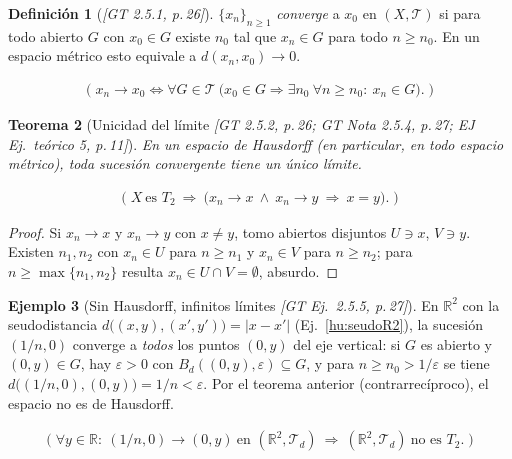 \documentclass[11pt,a4paper]{article}
\newcommand{\lgc}[1]{\par\vspace{-3pt}\begin{gather*}\big(\;#1\;\big)\end{gather*}\vspace{-6pt}}
\theoremstyle{definition}
\newtheorem{definicion}{Definición}[section]
\newtheorem{ejemplo}[definicion]{Ejemplo}
\theoremstyle{plain}
\newtheorem{teorema}[definicion]{Teorema}
\newcommand{\fnt}[1]{{\normalfont\small\itshape\color{gray!150!black}[#1]}}
\newcommand{\R}{\mathbb{R}}
\newcommand{\Bola}[2]{B_d(#1,#2)}
\newcommand{\tp}{\mathcal{T}}
\begin{document}
\begin{definicion}[\fnt{GT 2.5.1, p.\,26}]
$\{x_n\}_{n\ge1}$ \emph{converge} a $x_0$ en $(X,\tp)$ si para todo abierto $G$ con $x_0\in G$ existe $n_0$ tal que $x_n\in G$ para todo $n\ge n_0$. En un espacio métrico esto equivale a $d(x_n,x_0)\to 0$.
\lgc{x_n\to x_0\iff \forall G\in\tp\ \big(x_0\in G\Rightarrow \exists n_0\ \forall n\ge n_0:\ x_n\in G\big).}
\end{definicion}

\begin{teorema}[Unicidad del límite \fnt{GT 2.5.2, p.\,26; GT Nota 2.5.4, p.\,27; EJ Ej.\ teórico 5, p.\,11}]
En un espacio de Hausdorff (en particular, en todo espacio métrico), toda sucesión convergente tiene un único límite.
\lgc{X\ \text{es } T_2\ \Rightarrow\ \big(x_n\to x\ \wedge\ x_n\to y\ \Rightarrow\ x=y\big).}
\end{teorema}

\begin{proof}
Si $x_n\to x$ y $x_n\to y$ con $x\ne y$, tomo abiertos disjuntos $U\ni x$, $V\ni y$. Existen $n_1,n_2$ con $x_n\in U$ para $n\ge n_1$ y $x_n\in V$ para $n\ge n_2$; para $n\ge\max\{n_1,n_2\}$ resulta $x_n\in U\cap V=\emptyset$, absurdo.
\end{proof}

\begin{ejemplo}[Sin Hausdorff, infinitos límites \fnt{GT Ej.\ 2.5.5, p.\,27}]\label{hu:inflim}
En $\R^2$ con la seudodistancia $d\big((x,y),(x',y')\big)=|x-x'|$ (Ej.~\ref{hu:seudoR2}), la sucesión $(1/n,0)$ converge a \emph{todos} los puntos $(0,y)$ del eje vertical: si $G$ es abierto y $(0,y)\in G$, hay $\varepsilon>0$ con $\Bola{(0,y)}{\varepsilon}\subseteq G$, y para $n\ge n_0>1/\varepsilon$ se tiene $d\big((1/n,0),(0,y)\big)=1/n<\varepsilon$. Por el teorema anterior (contrarrecíproco), el espacio no es de Hausdorff.
\lgc{\forall y\in\R:\ (1/n,0)\to(0,y)\ \text{en } (\R^2,\tp_d)\ \Rightarrow\ (\R^2,\tp_d)\ \text{no es } T_2.}
\end{ejemplo}
\end{document}
